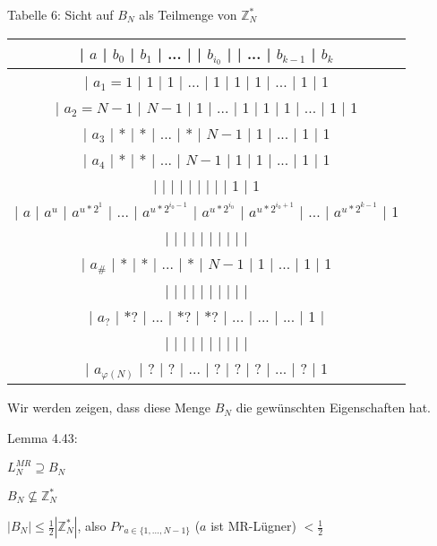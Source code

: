 \documentclass[a4paper]{article}
\begin{document}
\begin{multicols}{3}
        Tabelle 6: Sicht auf $B_N$ als Teilmenge von $\mathbb{Z}^*_N$
        \begin{tabular}{c}
        | $a$       | $b_0$ | $b_1$    | ... |          | $b_{i_0}$    |          | ... | $b_{k-1}$    | $b_k$ \\\hline
        | $a_1=1$     | 1   | 1      | ... | 1         | 1        | 1         | ... | 1        | 1   \\
        | $a_2=N-1$    | $N-1$ | 1      | ... | 1         | 1        | 1         | ... | 1        | 1  \\
        | $a_3$      | *   | *      | ... | *         | $N-1$      | 1         | ... | 1        | 1   \\
        | $a_4$      | *   | *      | ... | $N-1$       | 1        | 1         | ... | 1        | 1   \\
        |         |    |       |   |          |         |          |   | 1        | 1   \\
        | $a$       | $a^u$ | $a^{u*2^1}$ | ... | $a^{u*2^{i_0-1}}$ | $a^{u*2^{i_0}}$ | $a^{u*2^{i_0+1}}$ | ... | $a^{u*2^{k-1}}$ | 1  \\
        |         |    |       |   |          |         |          |   |         |    \\
        | $a_{\#}$      | *   | *      | ... | *         | $N-1$      | 1         | ... | 1        | 1   \\
        |         |    |       |   |          |         |          |   |         |    \\
        | $a_?$      | $*?$ | ...     | $*?$ | $*?$       | ...       | ...        | ... | 1        |   \\
        |         |    |       |   |          |         |          |   |         |    \\
        | $a_{\varphi(N)}$ | ?   | ?      | ... | ?         | ?        | ?         | ... | ?        | 1   
        \end{tabular}


        Wir werden zeigen, dass diese Menge $B_N$ die gewünschten Eigenschaften hat.

        Lemma 4.43:
        \begin{enumerate*}
            \item $L^{MR}_N \supseteq B_N$
            \item $B_N \not\subseteq \mathbb{Z}^*_N$
            \item $|B_N|\leq \frac{1}{2} | \mathbb{Z}^*_N|$, also $Pr_{a\in\{1,...,N-1\}}$ ($a$ ist MR-Lügner) $<\frac{1}{2}$
        \end{enumerate*}


\end{multicols}
\end{document}
